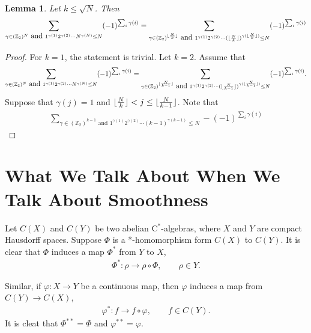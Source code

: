 \documentclass[a4paper,10pt]{amsart}
\newtheorem{lemma}{Lemma}[section]
\newcommand{\Z}{\mathbb Z} %
\DeclarePairedDelimiter\floor{\lfloor}{\rfloor}
\begin{document}
\begin{lemma}
    Let $k \leq \sqrt{N}$. Then
    \begin{align*}
    \sum_{\gamma \in (\Z_{2})^{N} \mbox{ and } 
    1^{\gamma(1)}2^{\gamma(2)}\cdots N^{\gamma(N)} \leq N} 
    (-1)^{\sum_{i}\gamma(i)} 
    = \sum_{\gamma \in (\Z_{2})^{\floor{\frac{N}{k}}} \mbox{ and } 
    1^{\gamma(1)}2^{\gamma(2)}\cdots 
    (\floor{\frac{N}{k}})^{\gamma(\floor{\frac{N}{k}})} \leq N} 
    (-1)^{\sum_{i}\gamma(i)}
\end{align*}
\end{lemma}

\begin{proof}
   For $k = 1$, the statement is trivial. Let $k = 2$. 
       Assume that
    \begin{align*}
    \sum_{\gamma \in (\Z_{2})^{N} \mbox{ and } 
    1^{\gamma(1)}2^{\gamma(2)}\cdots N^{\gamma(N)} \leq N} 
    (-1)^{\sum_{i}\gamma(i)} 
    = \sum_{\gamma \in (\Z_{2})^{\floor{\frac{N}{k-1}}} \mbox{ and } 
    1^{\gamma(1)}2^{\gamma(2)}\cdots 
    (\floor{\frac{N}{k-1}})^{\gamma(\floor{\frac{N}{k-1}})} \leq N} 
    (-1)^{\sum_{i}\gamma(i)}.
\end{align*}
Suppose that $\gamma(j) = 1$ and 
$\floor{\frac{N}{k}} < j \leq \floor{\frac{N}{k-1}}$.
Note that
\begin{align*}
    \sum_{\gamma \in (\Z_{2})^{k-1} \mbox{ and } 
    1^{\gamma(1)}2^{\gamma(2)}\cdots (k-1)^{\gamma(k-1)} \leq N} 
    -(-1)^{\sum_{i}\gamma(i)} 
\end{align*}

\end{proof}

\section{What We Talk About When We Talk About Smoothness} 

Let $C(X)$ and $C(Y)$ be two abelian C$^*$-algebras, where
$X$ and $Y$ are compact Hausdorff spaces. Suppose $\varPhi$ 
is a *-homomorphism form $C(X)$ to $C(Y)$. It is clear that
$\varPhi$ induces a map $\varPhi^{*}$ from $Y$ to $X$,
\begin{align*}
    \varPhi^{*}: \rho \rightarrow \rho \circ \varPhi, \qquad
    \rho \in Y.
\end{align*}

Similar, if $\varphi: X \rightarrow Y$ be a continuous map, then
$\varphi$ induces a map from $C(Y) \rightarrow C(X)$,
\begin{align*}
    \varphi^{*}: f \rightarrow f \circ \varphi, \qquad 
    f \in C(Y).
\end{align*}
It is cleat that $\varPhi^{**} = \varPhi$ and $\varphi^{**} = \varphi$.
\end{document}
